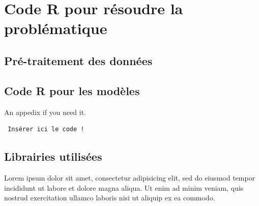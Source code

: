\documentclass[a4paper, oneside, 12pt, final]{extreport}
\begin{document}
\chapter{Code R pour résoudre la problématique}
\label{chap:appendix}


\section{Pré-traitement des données}
\section{Code R pour les modèles}

 An appedix if you need it.
 
 \begin{verbatim}
 Insérer ici le code !
 \end{verbatim}

\section{Librairies utilisées}
 
  Lorem ipsum dolor sit amet, consectetur adipisicing elit, sed do eiusmod
  tempor incididunt ut labore et dolore magna aliqua. Ut enim ad minim veniam,
  quis nostrud exercitation ullamco laboris nisi ut aliquip ex ea commodo.


\nocite{*}







%



\cleardoublepage%


\printglossaries
\printindex


\end{document}
